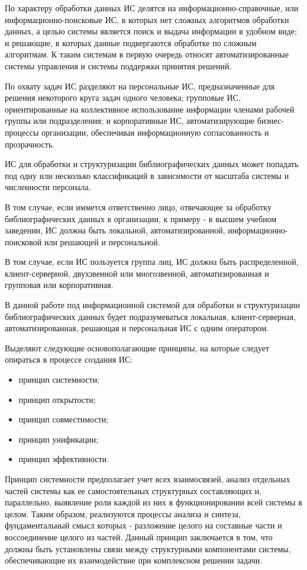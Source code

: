 По характеру обработки данных ИС делятся на информационно-справочные, или информационно-поисковые ИС, в которых нет сложных алгоритмов обработки данных, а целью системы является поиск и выдача информации в удобном виде; и решающие, в которых данные подвергаются обработке по сложным алгоритмам. К таким системам в первую очередь относят автоматизированные системы управления и системы поддержки принятия решений.

По охвату задач ИС разделяют на персональные ИС, предназначенные для решения некоторого круга задач одного человека; групповые ИС, ориентированные на коллективное использование информации членами рабочей группы или подразделения; и корпоративные ИС, автоматизирующие бизнес-процессы организации, обеспечивая информационную согласованность и прозрачность.

ИС для обработки и структуризации библиографических данных может попадать под одну или несколько классификаций в зависимости от масштаба системы и численности персонала.

В том случае, если иммется ответственно лицо, отвечающее за обработку библиографических данных в организации, к примеру - в высшем учебном заведении, ИС должна быть локальной, автоматизированной, информационно-поисковой или решающей и персональной.

В том случае, если ИС пользуется группа лиц, ИС должна быть распределенной, клиент-серверной, двухзвенной или многозвенной, автоматизированная и групповая или корпоративная.

В данной работе под информационной системой для обработки и структуризации библиографических данных будет подразумеваться локальная, клиент-серверная, автоматизированная, решающая и персональная ИС с одним оператором. 

Выделяют следующие основополагающие принципы, на которые следует опираться в процессе создания ИС:

\begin{itemize}
	\item принцип системности;
	\item принцип открытости;
	\item принцип совместимости;
	\item принцип унификации;
	\item принцип эффективности.
\end{itemize}

Принцип системности предполагает учет всех взаимосвязей, анализ отдельных частей системы как ее самостоятельных структурных составляющих и, параллельно, выявление роли каждой из них в функционировании всей системы в целом. Таким образом, реализуются процессы анализа и синтеза, фундаментальный смысл которых - разложение целого на составные части и воссоединение целого из частей. Данный принцип заключается в том, что должны быть установлены связи между структурными компонентами системы, обеспечивающие их взаимодействие при комплексном решении задачи.

